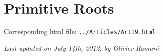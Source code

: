 \chapter{  Primitive Roots}

Corresponding html file: \texttt{../Articles/Art19.html}










 
 







  
\begin{flushright}\small\sl{}   Last updated on July 14th, 2012, by Olivier Ramar\'e
 \end{flushright}















